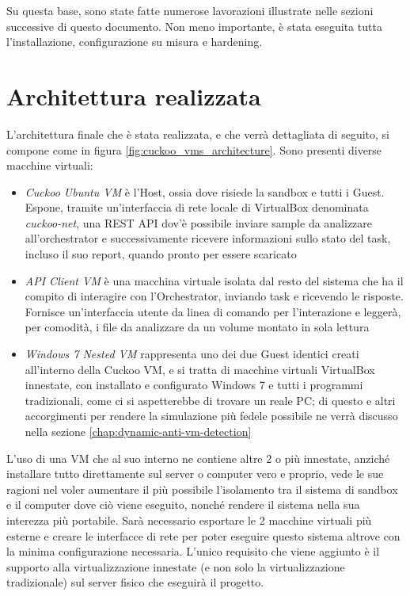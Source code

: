 Su questa base, sono state fatte numerose lavorazioni illustrate nelle sezioni successive di questo documento. Non meno importante, è stata eseguita tutta l'installazione, configurazione su misura e hardening.

\section{Architettura realizzata}
L'architettura finale che è stata realizzata, e che verrà dettagliata di seguito, si compone come in figura \ref{fig:cuckoo_vms_architecture}.
Sono presenti diverse macchine virtuali:
\begin{itemize}
    \item \emph{Cuckoo Ubuntu VM} è l'Host, ossia dove risiede la sandbox e tutti i Guest. Espone, tramite un'interfaccia di rete locale di VirtualBox denominata \emph{cuckoo-net}, una REST API dov'è possibile inviare sample da analizzare all'orchestrator e successivamente ricevere informazioni sullo stato del task, incluso il suo report, quando pronto per essere scaricato
    \item \emph{API Client VM} è una macchina virtuale isolata dal resto del sistema che ha il compito di interagire con l'Orchestrator, inviando task e ricevendo le risposte. Fornisce un'interfaccia utente da linea di comando per l'interazione e leggerà, per comodità, i file da analizzare da un volume montato in sola lettura
    \item \emph{Windows 7 Nested VM} rappresenta uno dei due Guest identici creati all'interno della Cuckoo VM, e si tratta di macchine virtuali VirtualBox innestate, con installato e configurato Windows 7 e tutti i programmi tradizionali, come ci si aspetterebbe di trovare un reale PC; di questo e altri accorgimenti per rendere la simulazione più fedele possibile ne verrà discusso nella sezione \ref{chap:dynamic-anti-vm-detection}
\end{itemize}

L'uso di una VM che al suo interno ne contiene altre 2 o più innestate, anziché installare tutto direttamente sul server o computer vero e proprio, vede le sue ragioni nel voler aumentare il più possibile l'isolamento tra il sistema di sandbox e il computer dove ciò viene eseguito, nonché rendere il sistema nella sua interezza più portabile. Sarà necessario esportare le 2 macchine virtuali più esterne e creare le interfacce di rete per poter eseguire questo sistema altrove con la minima configurazione necessaria. L'unico requisito che viene aggiunto è il supporto alla virtualizzazione innestate (e non solo la virtualizzazione tradizionale) sul server fisico che eseguirà il progetto.

